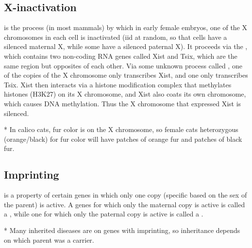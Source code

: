 \subsection{X-inactivation}

\begin{defn}
	 is the process (in most mammals) by which in early female embryos, one of the X chromosomes in each cell is inactivated (iid at random, so that cells have a silenced maternal X, while some have a silenced paternal X). 
		It proceeds via the , which contains two non-coding RNA genes called Xist and Tsix, which are the same region but opposites of each other.
		Via some unknown process called , one of the copies of the X chromosome only transcribes Xist, and one only transcribes Tsix.
		Xist then interacts via a histone modification complex that methylates histones (H3K27) on its X chromosome, and Xist also coats its own chromosome, which causes DNA methylation.
		Thus the X chromosome that expressed Xist is silenced.
\end{defn}

\begin{exm}*
	In calico cats, fur color is on the X chromosome, so female cats heterozygous (orange/black) for fur color will have patches of orange fur and patches of black fur.
\end{exm}

\subsection{Imprinting}

\begin{defn}
	 is a property of certain genes in which only one copy (specific based on the sex of the parent) is active. 
	A genes for which only the maternal copy is active is called a , 
	while one for which only the paternal copy is active is called a .
\end{defn}

\begin{fact}*
	Many inherited diseases are on genes with imprinting, so inheritance depends on which parent was a carrier.
\end{fact}
